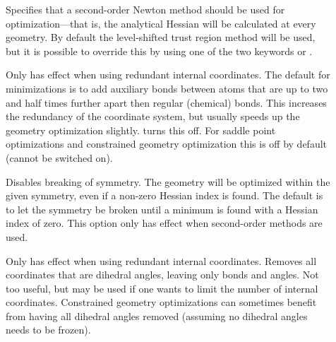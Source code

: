\begin{description}
\item[]
Specifies that a second-order Newton method should be used for
optimization---that is, the analytical Hessian will be calculated at
every geometry. By default the level-shifted trust region method will
be used, but it is possible to override this by using one of the two
keywords  or .

\item[]
Only has effect when using redundant internal coordinates. The default
for minimizations is to add auxiliary bonds between atoms that are up
to two and half times further apart then regular (chemical)
bonds. This increases the redundancy of the coordinate system, but
usually speeds up the geometry optimization slightly. 
turns this off. For saddle point optimizations and constrained
geometry optimization this is off by default (cannot be switched on).

\item[]
Disables breaking of symmetry.
The geometry will be optimized within the given symmetry, even if a non-zero Hessian
index is found. The default is to let the symmetry be broken until
a minimum is found with a Hessian index of
zero. This option only has effect when second-order methods are used.

\item[]
Only has effect when using redundant internal coordinates. Removes all
coordinates that are dihedral angles, leaving only bonds and
angles. Not too useful, but may be used if one wants to limit the
number of internal coordinates. Constrained geometry optimizations can
sometimes benefit from having all dihedral angles removed (assuming no
dihedral angles needs to be frozen).

%


\end{description}
